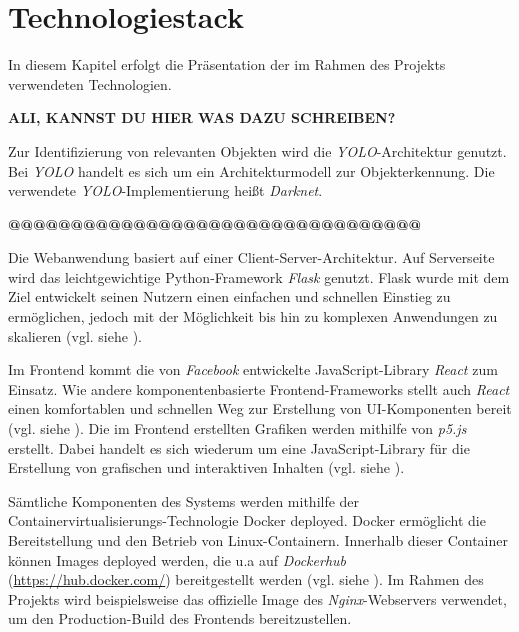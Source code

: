 \section{Technologiestack}

In diesem Kapitel erfolgt die Präsentation der im Rahmen des Projekts verwendeten Technologien.

\textbf{ALI, KANNST DU HIER WAS DAZU SCHREIBEN?}

Zur Identifizierung von relevanten Objekten wird die \textit{YOLO}-Architektur genutzt.
Bei \textit{YOLO} handelt es sich um ein Architekturmodell zur Objekterkennung.
Die verwendete \textit{YOLO}-Implementierung heißt \textit{Darknet}. 

\textbf{@@@@@@@@@@@@@@@@@@@@@@@@@@@@@@@@@}

Die Webanwendung basiert auf einer Client-Server-Architektur.
Auf Serverseite wird das leichtgewichtige Python-Framework \textit{Flask} genutzt.
Flask wurde mit dem Ziel entwickelt seinen Nutzern einen einfachen und schnellen Einstieg zu ermöglichen, 
jedoch mit der Möglichkeit bis hin zu komplexen Anwendungen zu skalieren (vgl. siehe \cite{palletsprojects}). 

Im Frontend kommt die von \textit{Facebook} entwickelte JavaScript-Library \textit{React} zum Einsatz.
Wie andere komponentenbasierte Frontend-Frameworks stellt auch \textit{React} einen komfortablen und schnellen 
Weg zur Erstellung von UI-Komponenten bereit (vgl. siehe \cite{react.js}). 
Die im Frontend erstellten Grafiken werden mithilfe von \textit{p5.js} erstellt.
Dabei handelt es sich wiederum um eine JavaScript-Library für die Erstellung von grafischen und interaktiven
Inhalten (vgl. siehe \cite{p5.js}). 

Sämtliche Komponenten des Systems werden mithilfe der Container\-virtualisierungs-Technologie Docker deployed.
Docker ermöglicht die Bereitstellung und den Betrieb von Linux-Containern.
Innerhalb dieser Container können Images deployed werden, die u.a auf \textit{Dockerhub} (\url{https://hub.docker.com/}) 
bereitgestellt werden (vgl. siehe \cite{redhat-docker}).
Im Rahmen des Projekts wird beispielsweise das offizielle Image des \textit{Nginx}-Webservers verwendet, um den 
Production-Build des Frontends bereitzustellen. 


